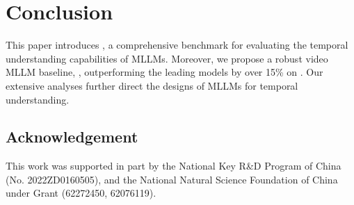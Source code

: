\section{Conclusion}
\label{sec:conclusion}

This paper introduces \BenchName, 
a comprehensive benchmark for evaluating the temporal understanding capabilities of MLLMs. 
Moreover,
we propose a robust video MLLM baseline,
\ModelName,
outperforming the leading models by over 15\% on \BenchName.
Our extensive analyses further direct the designs of MLLMs for temporal understanding.\subsection*{Acknowledgement}
This work was supported in part by the National Key R\&D Program of China (No. 2022ZD0160505), and the National Natural Science Foundation of China under Grant (62272450, 62076119).

